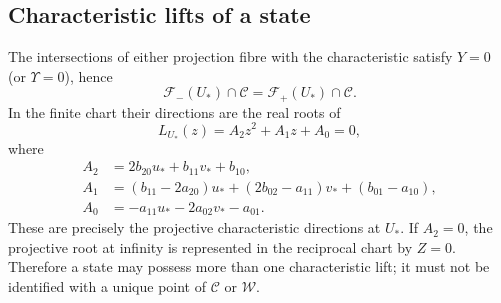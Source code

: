 \subsection{Characteristic lifts of a state}
The intersections of either projection fibre with the characteristic satisfy
$Y=0$ (or $\Upsilon=0$), hence
\[
 \mathcal F_-(U_*)\cap\mathcal C
 =\mathcal F_+(U_*)\cap\mathcal C.
\]
In the finite chart their directions are the real roots of
\[
 \boxed{L_{U_*}(z)=A_2z^2+A_1z+A_0=0},
\]
where
\begin{align*}
 A_2&=2b_{20}u_*+b_{11}v_*+b_{10},\\
 A_1&=(b_{11}-2a_{20})u_*+(2b_{02}-a_{11})v_*+(b_{01}-a_{10}),\\
 A_0&=-a_{11}u_*-2a_{02}v_*-a_{01}.
\end{align*}
These are precisely the projective characteristic directions at $U_*$.  If
$A_2=0$, the projective root at infinity is represented in the reciprocal chart
by $Z=0$.  Therefore a state may possess more than one characteristic lift;
it must not be identified with a unique point of $\mathcal C$ or $\mathcal W$.
